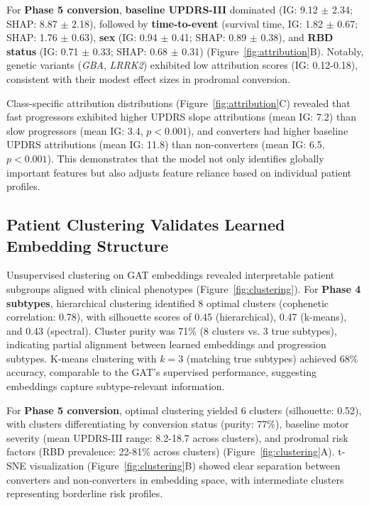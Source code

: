 For \textbf{Phase 5 conversion}, \textbf{baseline UPDRS-III} dominated (IG: 9.12 $\pm$ 2.34; SHAP: 8.87 $\pm$ 2.18), followed by \textbf{time-to-event} (survival time, IG: 1.82 $\pm$ 0.67; SHAP: 1.76 $\pm$ 0.63), \textbf{sex} (IG: 0.94 $\pm$ 0.41; SHAP: 0.89 $\pm$ 0.38), and \textbf{RBD status} (IG: 0.71 $\pm$ 0.33; SHAP: 0.68 $\pm$ 0.31) (Figure~\ref{fig:attribution}B). Notably, genetic variants (\textit{GBA}, \textit{LRRK2}) exhibited low attribution scores (IG: 0.12-0.18), consistent with their modest effect sizes in prodromal conversion\cite{iwaki2019genetic}.

Class-specific attribution distributions (Figure~\ref{fig:attribution}C) revealed that fast progressors exhibited higher UPDRS slope attributions (mean IG: 7.2) than slow progressors (mean IG: 3.4, $p < 0.001$), and converters had higher baseline UPDRS attributions (mean IG: 11.8) than non-converters (mean IG: 6.5, $p < 0.001$). This demonstrates that the model not only identifies globally important features but also adjusts feature reliance based on individual patient profiles.

\subsection{Patient Clustering Validates Learned Embedding Structure}

Unsupervised clustering on GAT embeddings revealed interpretable patient subgroups aligned with clinical phenotypes (Figure~\ref{fig:clustering}). For \textbf{Phase 4 subtypes}, hierarchical clustering identified 8 optimal clusters (cophenetic correlation: 0.78), with silhouette scores of 0.45 (hierarchical), 0.47 (k-means), and 0.43 (spectral). Cluster purity was 71\% (8 clusters vs. 3 true subtypes), indicating partial alignment between learned embeddings and progression subtypes. K-means clustering with $k=3$ (matching true subtypes) achieved 68\% accuracy, comparable to the GAT's supervised performance, suggesting embeddings capture subtype-relevant information.

For \textbf{Phase 5 conversion}, optimal clustering yielded 6 clusters (silhouette: 0.52), with clusters differentiating by conversion status (purity: 77\%), baseline motor severity (mean UPDRS-III range: 8.2-18.7 across clusters), and prodromal risk factors (RBD prevalence: 22-81\% across clusters) (Figure~\ref{fig:clustering}A). t-SNE visualization (Figure~\ref{fig:clustering}B) showed clear separation between converters and non-converters in embedding space, with intermediate clusters representing borderline risk profiles.

